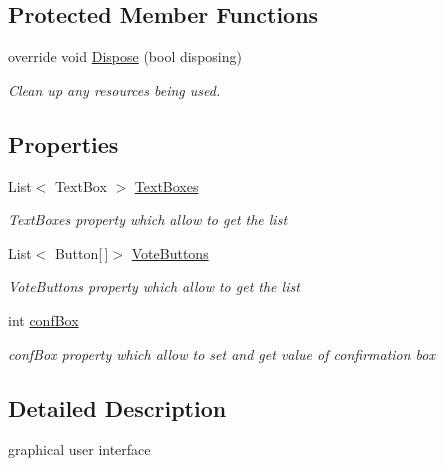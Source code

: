 \subsection*{Protected Member Functions}
\begin{DoxyCompactItemize}
\item 
override void \hyperlink{class_voter_1_1_form1_abbf758d7a18bf7b34f41a46f021d747e}{Dispose} (bool disposing)
\begin{DoxyCompactList}\small\item\em Clean up any resources being used. \end{DoxyCompactList}\end{DoxyCompactItemize}
\subsection*{Properties}
\begin{DoxyCompactItemize}
\item 
List$<$ Text\+Box $>$ \hyperlink{class_voter_1_1_form1_a5c5e90b6fa99ecbaec0ee5b7d48f4d1d}{Text\+Boxes}
\begin{DoxyCompactList}\small\item\em Text\+Boxes property which allow to get the list \end{DoxyCompactList}\item 
List$<$ Button\mbox{[}$\,$\mbox{]}$>$ \hyperlink{class_voter_1_1_form1_aa1ad45e2e705942b18168e5bb6a96d53}{Vote\+Buttons}
\begin{DoxyCompactList}\small\item\em Vote\+Buttons property which allow to get the list \end{DoxyCompactList}\item 
int \hyperlink{class_voter_1_1_form1_a1a9fce02a2bbdbf9d3008b02b3b79bae}{conf\+Box}
\begin{DoxyCompactList}\small\item\em conf\+Box property which allow to set and get value of confirmation box \end{DoxyCompactList}\end{DoxyCompactItemize}


\subsection{Detailed Description}
graphical user interface 



